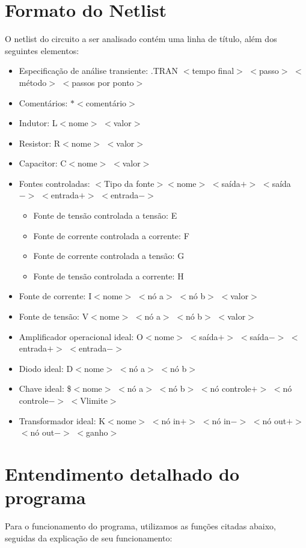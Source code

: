 \documentclass[12pt]{article}
\begin{document}
\section{Formato do Netlist}
O netlist do circuito a ser analisado contém uma linha de título, além dos seguintes elementos:

\begin{itemize}
  \item Especificação de análise transiente:
    .TRAN $<$tempo final$>$ $<$passo$>$ $<$método$>$ $<$passos por ponto$>$
  \item Comentários: $*<$comentário$>$
  \item Indutor: L$<$nome$>$ $<$valor$>$
  \item Resistor: R$<$nome$>$ $<$valor$>$
  \item Capacitor: C$<$nome$>$ $<$valor$>$
  \item Fontes controladas: $<$Tipo da fonte$>$$<$nome$>$ $<$saída$+>$ $<$saída$->$ $<$entrada$+>$ $<$entrada$->$
  \begin{itemize}
    \item Fonte de tensão controlada a tensão: E
    \item Fonte de corrente controlada a corrente: F
    \item Fonte de corrente controlada a tensão: G
    \item Fonte de tensão controlada a corrente: H
  \end{itemize}
  \item Fonte de corrente: I$<$nome$>$ $<$nó a$>$ $<$nó b$>$ $<$valor$>$
  \item Fonte de tensão: V$<$nome$>$ $<$nó a$>$ $<$nó b$>$ $<$valor$>$
  \item Amplificador operacional ideal: O$<$nome$>$ $<$saída$+>$ $<$saída$->$ $<$entrada$+>$ $<$entrada$->$
  \item Diodo ideal: D$<$nome$>$ $<$nó a$>$ $<$nó b$>$
  \item Chave ideal: \$$<$nome$>$ $<$nó a$>$ $<$nó b$>$ $<$nó controle$+>$ $<$nó controle$->$ $<$Vlimite$>$
  \item Transformador ideal: K$<$nome$>$ $<$nó in$+>$ $<$nó in$->$ $<$nó out$+>$ $<$nó out$->$ $<$ganho$>$
\end{itemize}


\section{Entendimento detalhado do programa}
	Para o funcionamento do programa, utilizamos as funções citadas abaixo, seguidas da explicação de seu funcionamento:\\
\end{document}
